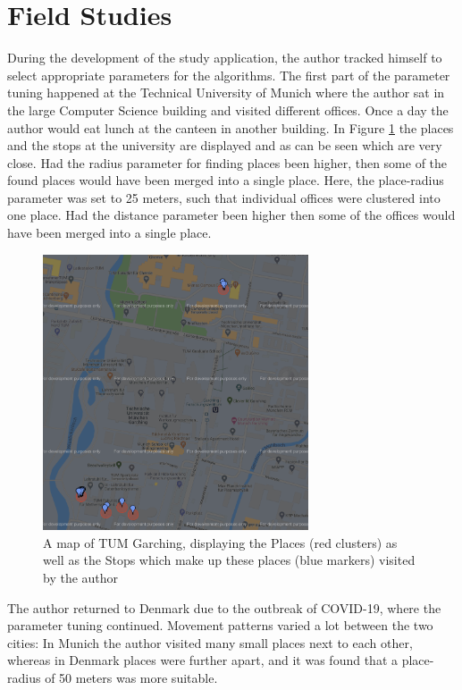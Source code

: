 \section{Field Studies}
During the development of the study application, the author tracked himself to select appropriate parameters for the algorithms. The first part of the parameter tuning happened at the Technical University of Munich where the author sat in the large Computer Science building and visited different offices. Once a day the author would eat lunch at the canteen in another building. In Figure \ref{fig:tum-map} the places and the stops at the university are displayed and as can be seen which are very close. Had the radius parameter for finding places been higher, then some of the found places would have been merged into a single place. Here, the place-radius parameter was set to 25 meters, such that individual offices were clustered into one place. Had the distance parameter been higher then some of the offices would have been merged into a single place.\\

\begin{figure}[h]
    \centering
    \includegraphics[width=0.7\textwidth]{images/map/map-tum.png}
    \caption{A map of TUM Garching, displaying the Places (red clusters) as well as the Stops which make up these places (blue markers) visited by the author}
    \label{fig:tum-map}
\end{figure}

The author returned to Denmark due to the outbreak of COVID-19, where the parameter tuning continued. Movement patterns varied a lot between the two cities: In Munich the author visited many small places next to each other, whereas in Denmark places were further  apart, and it was found that a place-radius of 50 meters was more suitable.\\

